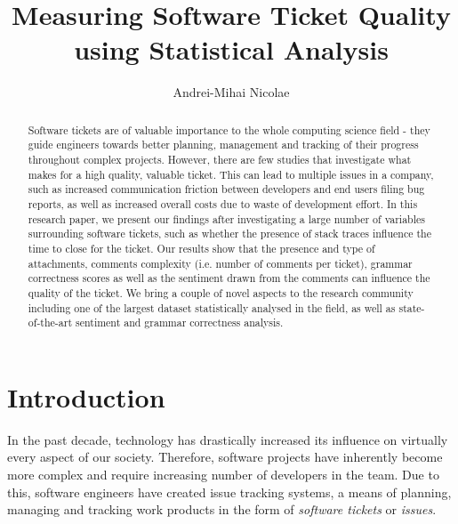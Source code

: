 \documentclass{mpaper}
\begin{document}
\title{Measuring Software Ticket Quality using Statistical Analysis}
\author{Andrei-Mihai Nicolae}

\maketitle

\begin{abstract}
Software tickets are of valuable importance to the whole computing science 
field - they guide engineers towards better planning, management 
and tracking of their progress throughout complex projects. However, there
are few studies that investigate what makes for a high quality,
valuable ticket. This can lead to multiple issues in a company, such as 
increased communication friction between developers and end users filing bug
reports, as well as increased overall costs due to waste of development effort. 
In this research paper, we present our findings after 
investigating a large number of variables surrounding software tickets, 
such as whether the presence of stack traces influence the time 
to close for the ticket. Our results show that the presence and type of attachments,
comments complexity (i.e. number of comments per ticket), grammar correctness scores
as well as the sentiment drawn from the comments can influence the quality of the ticket.
We bring a couple of novel aspects to the research
community including one of the largest dataset statistically analysed in the field,
as well as state-of-the-art sentiment and grammar correctness analysis.
\end{abstract}

\section{Introduction}

In the past decade, technology has drastically increased its influence on 
virtually every aspect of our society. Therefore, software projects have 
inherently become more complex and require increasing number of developers in
the team. Due to this, software engineers have created issue tracking systems,
a means of planning, managing and tracking work products in the form of 
\emph{software tickets} or \emph{issues}.
\end{document}
